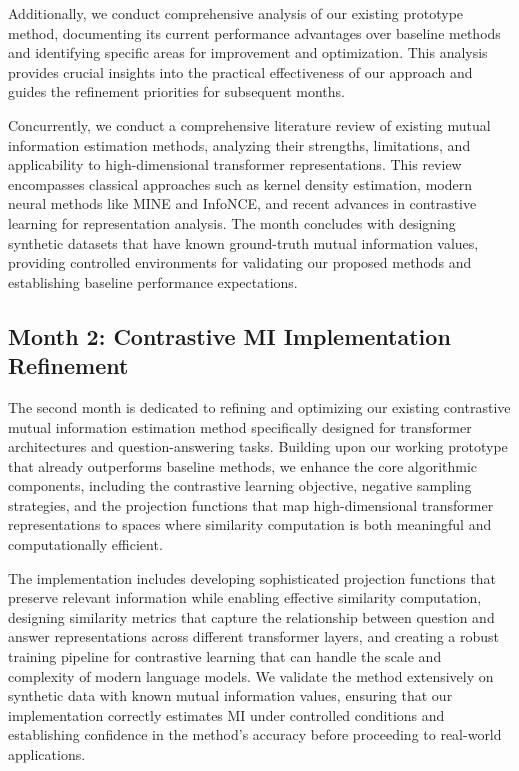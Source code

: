\documentclass[11pt, oneside]{book}
\theoremstyle{plain}
\theoremstyle{definition}
\theoremstyle{remark}
\begin{document}
Additionally, we conduct comprehensive analysis of our existing prototype method, documenting its current performance advantages over baseline methods and identifying specific areas for improvement and optimization. This analysis provides crucial insights into the practical effectiveness of our approach and guides the refinement priorities for subsequent months.

Concurrently, we conduct a comprehensive literature review of existing mutual information estimation methods, analyzing their strengths, limitations, and applicability to high-dimensional transformer representations. This review encompasses classical approaches such as kernel density estimation, modern neural methods like MINE and InfoNCE, and recent advances in contrastive learning for representation analysis. The month concludes with designing synthetic datasets that have known ground-truth mutual information values, providing controlled environments for validating our proposed methods and establishing baseline performance expectations.

\subsection{Month 2: Contrastive MI Implementation Refinement}

The second month is dedicated to refining and optimizing our existing contrastive mutual information estimation method specifically designed for transformer architectures and question-answering tasks. Building upon our working prototype that already outperforms baseline methods, we enhance the core algorithmic components, including the contrastive learning objective, negative sampling strategies, and the projection functions that map high-dimensional transformer representations to spaces where similarity computation is both meaningful and computationally efficient.

The implementation includes developing sophisticated projection functions that preserve relevant information while enabling effective similarity computation, designing similarity metrics that capture the relationship between question and answer representations across different transformer layers, and creating a robust training pipeline for contrastive learning that can handle the scale and complexity of modern language models. We validate the method extensively on synthetic data with known mutual information values, ensuring that our implementation correctly estimates MI under controlled conditions and establishing confidence in the method's accuracy before proceeding to real-world applications.
\end{document}
